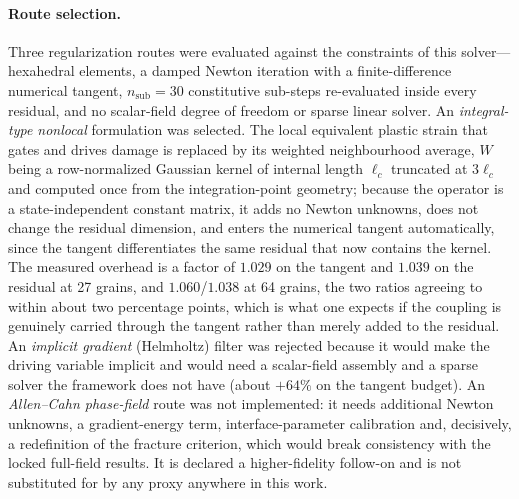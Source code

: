 \documentclass[11pt,a4paper,twocolumn]{article}
\begin{document}
\paragraph{Route selection.} Three regularization routes were evaluated against the constraints of this
solver---hexahedral elements, a damped Newton iteration with a finite-difference numerical tangent,
$n_{\mathrm{sub}} = 30$ constitutive sub-steps re-evaluated inside every residual, and no scalar-field degree
of freedom or sparse linear solver. An \emph{integral-type nonlocal} formulation was selected. The local
equivalent plastic strain that gates and drives damage is replaced by its weighted neighbourhood average, $W$
being a row-normalized Gaussian kernel of internal length $\ell_c$ truncated at $3\ell_c$ and computed once
from the integration-point geometry; because the operator is a state-independent constant matrix, it adds no
Newton unknowns, does not change the residual dimension, and enters the numerical tangent automatically, since
the tangent differentiates the same residual that now contains the kernel. The measured overhead is a factor
of $1.029$ on the tangent and $1.039$ on the residual at 27 grains, and $1.060$/$1.038$ at 64 grains, the two
ratios agreeing to within about two percentage points, which is what one expects if the coupling is genuinely
carried through the tangent rather than merely added to the residual. An \emph{implicit gradient} (Helmholtz)
filter was rejected because it would make the driving variable implicit and would need a scalar-field assembly
and a sparse solver the framework does not have (about $+64\%$ on the tangent budget). An \emph{Allen--Cahn
phase-field} route was not implemented: it needs additional Newton unknowns, a gradient-energy term,
interface-parameter calibration and, decisively, a redefinition of the fracture criterion, which would break
consistency with the locked full-field results. It is declared a higher-fidelity follow-on and is not
substituted for by any proxy anywhere in this work.
\end{document}
